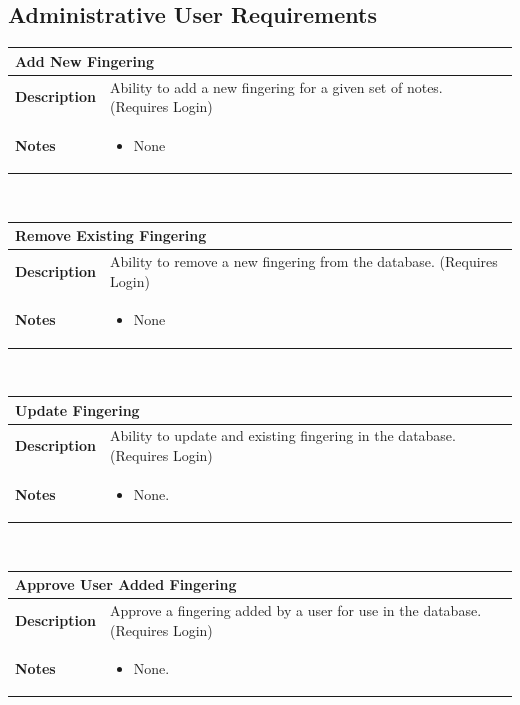 \documentclass[12pt,english]{article}
\providecommand{\tabularnewline}{\\}
\begin{document}
\subsection{Administrative User Requirements}
\begin{tabular}{|p{3cm}|p{13cm}|}
	\hline 
	\multicolumn{2}{|l|}{\textbf{Add New Fingering}}\tabularnewline
	\hline 
	\textbf{Description}  & Ability to add a new fingering for a given set of notes. (Requires Login) \tabularnewline
	\hline 
	\textbf{Notes}  & 
		\begin{itemize}
			\item None 
		\end{itemize}
	\tabularnewline
	\hline 
\end{tabular}\\[0.5cm] %
\begin{tabular}{|p{3cm}|p{13cm}|}
	\hline 
	\multicolumn{2}{|l|}{\textbf{Remove Existing Fingering}}\tabularnewline
	\hline 
	\textbf{Description}  & Ability to remove a new fingering from the database. (Requires Login) \tabularnewline
	\hline 
	\textbf{Notes}  & 
		\begin{itemize}
			\item None 
		\end{itemize}
	\tabularnewline
	\hline 
\end{tabular}\\[0.5cm] %
\begin{tabular}{|p{3cm}|p{13cm}|}
	\hline 
	\multicolumn{2}{|l|}{\textbf{Update Fingering}}\tabularnewline
	\hline 
	\textbf{Description}  & Ability to update and existing fingering in the database. (Requires Login) \tabularnewline
	\hline 
	\textbf{Notes}  & 
		\begin{itemize}
			\item None. 
		\end{itemize}
	\tabularnewline
	\hline 
\end{tabular}\\[0.5cm] %
\begin{tabular}{|p{3cm}|p{13cm}|}
	\hline 
	\multicolumn{2}{|l|}{\textbf{Approve User Added Fingering}}\tabularnewline
	\hline 
	\textbf{Description}  & Approve a fingering added by a user for use in the database. (Requires Login) \tabularnewline
	\hline 
	\textbf{Notes}  & 
		\begin{itemize}
			\item None. 
		\end{itemize}
	\tabularnewline
	\hline 
\end{tabular}\\[0.5cm] %
\end{document}
